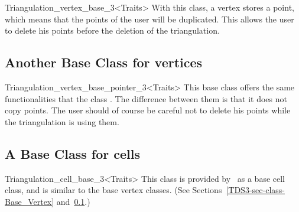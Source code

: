	\begin{ccClassTemplate}{Triangulation_vertex_base_3<Traits>}
With this class, a vertex stores a point, which means that the points
of the user will be duplicated. This allows the user to delete his
points before the deletion of the triangulation.

	\end{ccClassTemplate} 

	\subsection{Another Base Class for vertices}
	\label{TDS3-sec-class-Base_Vertex_pointer}

	\begin{ccClassTemplate}{Triangulation_vertex_base_pointer_3<Traits>}
This base class offers the same functionalities that the class
. The difference between them is that 
it does not copy points. The user should of course be careful not to
delete his points while the triangulation is using them. 

	\end{ccClassTemplate}

	\subsection{A Base Class for cells}

	\begin{ccClassTemplate}{Triangulation_cell_base_3<Traits>}
This class is provided by \cgal\ as a base cell class, and is similar
to the base vertex classes. (See
Sections~\ref{TDS3-sec-class-Base_Vertex}
and~\ref{TDS3-sec-class-Base_Vertex_pointer}.) 


	\end{ccClassTemplate} 
